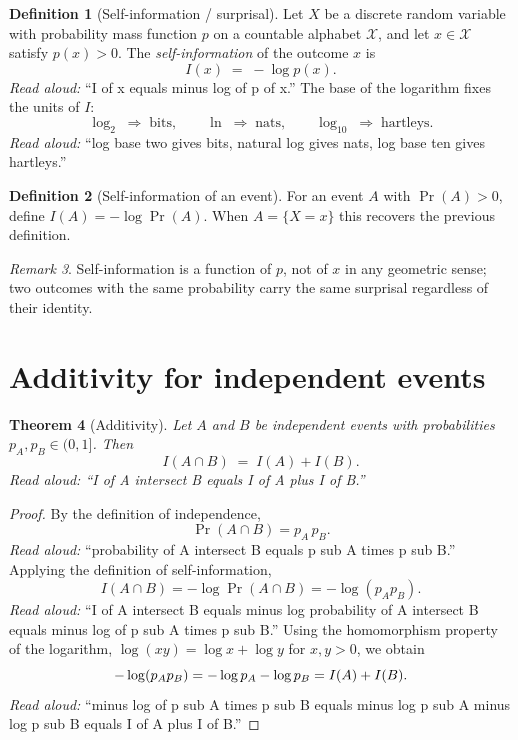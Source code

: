 \documentclass[11pt]{article}
\newtheorem{theorem}{Theorem}
\theoremstyle{definition}
\newtheorem{definition}[theorem]{Definition}
\theoremstyle{remark}
\newtheorem{remark}[theorem]{Remark}
\begin{document}
\begin{definition}[Self-information / surprisal]
Let $X$ be a discrete random variable with probability mass function $p$
on a countable alphabet $\mathcal{X}$, and let $x \in \mathcal{X}$ satisfy
$p(x) > 0$. The \emph{self-information} of the outcome $x$ is
\[
  I(x) \;=\; -\log p(x).
\]
\emph{Read aloud:} ``I of x equals minus log of p of x.''
The base of the logarithm fixes the units of $I$:
\[
  \log_2 \;\Rightarrow\; \text{bits}, \qquad
  \ln    \;\Rightarrow\; \text{nats}, \qquad
  \log_{10} \;\Rightarrow\; \text{hartleys.}
\]
\emph{Read aloud:} ``log base two gives bits, natural log gives nats, log base ten gives hartleys.''
\end{definition}

\begin{definition}[Self-information of an event]
For an event $A$ with $\Pr(A) > 0$, define
$I(A) = -\log \Pr(A)$. When $A = \{X = x\}$ this recovers the previous
definition.
\end{definition}

\begin{remark}
Self-information is a function of $p$, not of $x$ in any geometric sense;
two outcomes with the same probability carry the same surprisal regardless
of their identity.
\end{remark}

\section{Additivity for independent events}

\begin{theorem}[Additivity]\label{thm:additivity}
Let $A$ and $B$ be independent events with probabilities $p_A, p_B \in (0,1]$.
Then
\[
  I(A \cap B) \;=\; I(A) + I(B).
\]
\emph{Read aloud:} ``I of A intersect B equals I of A plus I of B.''
\end{theorem}

\begin{proof}
By the definition of independence,
\[
  \Pr(A \cap B) = p_A \, p_B.
\]
\emph{Read aloud:} ``probability of A intersect B equals p sub A times p sub B.''
Applying the definition of self-information,
\[
  I(A \cap B) = -\log \Pr(A \cap B) = -\log(p_A p_B).
\]
\emph{Read aloud:} ``I of A intersect B equals minus log probability of A intersect B equals minus log of p sub A times p sub B.''
Using the homomorphism property of the logarithm, $\log(xy) = \log x + \log y$
for $x, y > 0$, we obtain
\[
  -\log(p_A p_B) = -\log p_A - \log p_B = I(A) + I(B). \qedhere
\]
\emph{Read aloud:} ``minus log of p sub A times p sub B equals minus log p sub A minus log p sub B equals I of A plus I of B.''
\end{proof}
\end{document}
